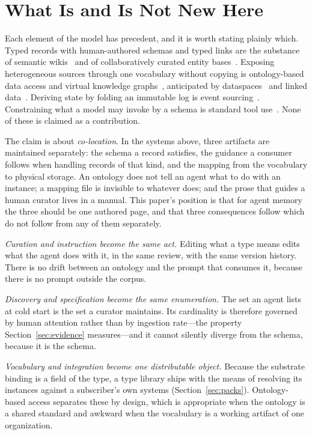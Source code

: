 \documentclass[journal,nofonttune]{IEEEtran}
\begin{document}
\section{What Is and Is Not New Here}
\label{sec:novelty}

Each element of the model has precedent, and it is worth stating plainly
which. Typed records with human-authored schemas and typed links are the
substance of semantic wikis~\cite{semanticwiki} and of collaboratively curated
entity bases~\cite{wikidata,schemaorg}. Exposing heterogeneous sources through
one vocabulary without copying is ontology-based data access and virtual
knowledge graphs~\cite{obda}, anticipated by dataspaces~\cite{dataspaces} and
linked data~\cite{linkeddata}. Deriving state by folding an immutable log is
event sourcing~\cite{eventsourcing}. Constraining what a model may invoke by a
schema is standard tool use~\cite{toolformer}. None of these is claimed as a
contribution.

The claim is about \emph{co-location}. In the systems above, three artifacts
are maintained separately: the schema a record satisfies, the guidance a
consumer follows when handling records of that kind, and the mapping from the
vocabulary to physical storage. An ontology does not tell an agent what to do
with an instance; a mapping file is invisible to whatever does; and the prose
that guides a human curator lives in a manual. This paper's position is that
for agent memory the three should be one authored page, and that three
consequences follow which do not follow from any of them separately.

\emph{Curation and instruction become the same act.} Editing what a type means
edits what the agent does with it, in the same review, with the same version
history. There is no drift between an ontology and the prompt that consumes
it, because there is no prompt outside the corpus.

\emph{Discovery and specification become the same enumeration.} The set an
agent lists at cold start is the set a curator maintains. Its cardinality is
therefore governed by human attention rather than by ingestion rate---the
property Section~\ref{sec:evidence} measures---and it cannot silently diverge
from the schema, because it is the schema.

\emph{Vocabulary and integration become one distributable object.} Because the
substrate binding is a field of the type, a type library ships with the means
of resolving its instances against a subscriber's own systems
(Section~\ref{sec:packs}). Ontology-based access separates these by design,
which is appropriate when the ontology is a shared standard and awkward when
the vocabulary is a working artifact of one organization.
\end{document}
